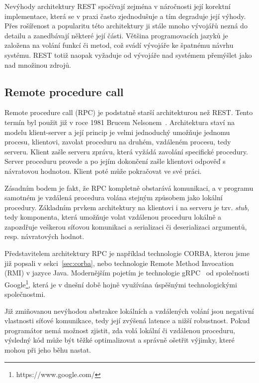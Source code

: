 Nevýhody architektury \gls{REST} spočívají zejména v náročnosti její korektní implementace,
která se v praxi často zjednodušuje a tím degraduje její výhody. Přes rošířenost a popularitu
této architektury ji stále mnoho vývojářů nezná do detailu a zanedbávají některé její části.
Většina programovacích jazyků je založena na volání funkcí či metod, což svádí vývojáře ke
špatnému návrhu systému. \gls{REST} totiž naopak vyžaduje od vývojáře nad systémem přemýšlet jako
nad množinou zdrojů.

\subsection{Remote procedure call}\label{sec:rpc}

Remote procedure call (\gls{RPC}) je podstatně starší architekturou než \gls{REST}.
Tento termín byl použit již v roce 1981 Brucem Nelsonem~\cite{nelson1981remote}.
Architektura staví na modelu klient-server a její princip je velmi jednoduchý \textendash
umožňuje jednomu procesu, klientovi, zavolat proceduru na druhém, vzdáleném procesu, tedy serveru.
Klient zašle serveru zprávu, která vyžádá zavolání specifické procedury. Server
proceduru provede a po jejím dokončení zašle klientovi odpověď s návratovou hodnotou.
Klient poté může pokračovat ve své práci.

Zásadním bodem je fakt, že \gls{RPC} kompletně obstarává komunikaci, a v programu samotném
je vzdálená procedura volána stejným způsobem jako lokální procedury. Základním
prvkem architektury na klientovi i na serveru je tzv. \textit{stub}, tedy komponenta, která
umožňuje volat vzdálenou proceduru lokálně a zapozdřuje veškerou síťovou komunikaci
a serializaci či deserializaci argumentů, resp. návratových hodnot.

Představitelem architektury \gls{RPC} je například technologie \gls{CORBA},
kterou jsme již popsali v sekci~\ref{sec:corba}, nebo technologie Remote Method Invocation (\gls{RMI})
v jazyce Java. Modernějším pojetím je technologie gRPC~\cite{grpcio}
od společnosti Google\footnote{https://www.google.com/},
která je v dnešní době hojně využívána úspěšnými technologickými společnostmi.

Již zmiňovanou nevýhodou abstrakce lokálních a vzdálených volání jsou
negativní vlastnosti síťové komunikace, tedy její zvýšená latence
a nižší robustnost. Pokud programátor nemá možnost zjistit, zda volá
lokální či vzdálenou proceduru, výsledný kód může být těžké optimalizovat
a správně ošetřit výjimky, které mohou při jeho běhu nastat.

